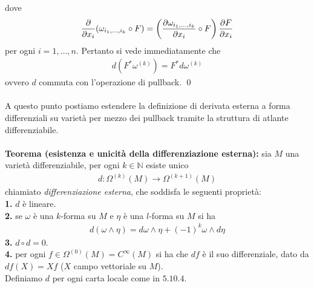 \documentclass{article}
\begin{document}
dove
\begin{align}
    \frac{\partial}{\partial x_i}(\omega_{i_1, \dots, i_k} \circ F) = \left(\frac{\partial \omega_{i_1, \dots, i_k}}{\partial x_i} \circ F\right)\frac{\partial F}{\partial x_i} \notag
\end{align}
per ogni $i = 1, \dots, n$. Pertanto si vede immediatamente che
\begin{align}
    d(F^*\omega^{(k)}) = F^*d\omega^{(k)} \tag{5.10.12}
\end{align}
ovvero $d$ commuta con l'operazione di pullback. \qed \\ \\
A questo punto postiamo estendere la definizione di derivata esterna a forma differenziali su varietà per mezzo dei pullback tramite la struttura di atlante differenziabile. \\ \\
\textbf{Teorema (esistenza e unicità della differenziazione esterna):} sia $M$ una varietà differenziabile, per ogni $k \in \mathbb{N}$ esiste unico
\begin{align*}
    d : \Omega^{(k)}(M) \longrightarrow \Omega^{(k + 1)}(M) \tag{5.10.13}
\end{align*}
chiamiato \textit{differenziazione esterna}, che soddisfa le seguenti proprietà: \\
\textbf{1.} $d$ è lineare. \\
\textbf{2.} se $\omega$ è una $k$-forma su $M$ e $\eta$ è una $l$-forma su $M$ si ha
\begin{align*}
    d(\omega \wedge \eta) = d\omega \wedge \eta + (-1)^k\omega \wedge d\eta \tag{5.10.14}
\end{align*}
\textbf{3.} $d \circ d = 0$. \\
\textbf{4.} per ogni $f \in \Omega^{(0)}(M) = C^\infty(M)$ si ha che $df$ è il suo differenziale, dato da $df(X) = Xf$ ($X$ campo vettoriale su $M$). \\
Definiamo $d$ per ogni carta locale come in $5.10.4$. \\
\end{document}
